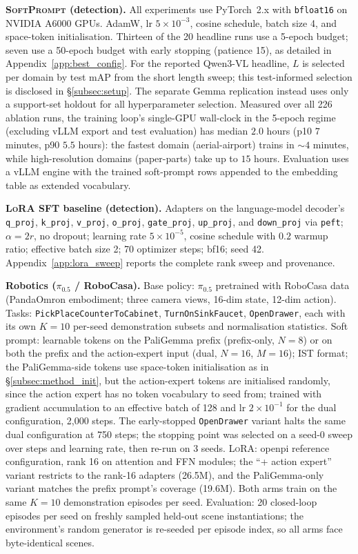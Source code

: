 \documentclass{article}
\newcommand{\ours}{\textsc{SoftPrompt}}
\newcommand{\lora}{\textsc{LoRA}}
\newcommand{\qwen}{Qwen3-VL}
\begin{document}
\textbf{\ours{} (detection).}
All experiments use PyTorch~2.x with \texttt{bfloat16} on NVIDIA A6000 GPUs.
AdamW, lr $5{\times}10^{-3}$, cosine schedule, batch size 4, and space-token
initialisation.
Thirteen of the 20 headline runs use a 5-epoch budget; seven use a 50-epoch
budget with early stopping (patience 15), as detailed in
Appendix~\ref{app:best_config}.
For the reported \qwen{} headline, $L$ is selected per domain by test mAP from
the short length sweep; this test-informed selection is disclosed in
\S\ref{subsec:setup}. The separate Gemma replication instead uses only a
support-set holdout for all hyperparameter selection.
Measured over all 226 ablation runs, the training loop's single-GPU wall-clock in the 5-epoch regime (excluding vLLM export and test evaluation) has median $2.0$ hours (p10 $7$ minutes, p90 $5.5$ hours): the fastest domain (aerial-airport) trains in ${\sim}4$ minutes, while high-resolution domains (paper-parts) take up to $15$ hours.
Evaluation uses a vLLM engine with the trained soft-prompt rows appended to the embedding table as extended vocabulary.

\textbf{\lora{} SFT baseline (detection).}
Adapters on the language-model decoder's \texttt{q\_proj},
\texttt{k\_proj}, \texttt{v\_proj}, \texttt{o\_proj},
\texttt{gate\_proj}, \texttt{up\_proj}, and \texttt{down\_proj} via
\texttt{peft}; $\alpha=2r$, no dropout; learning rate $5\times10^{-5}$,
cosine schedule with $0.2$ warmup ratio; effective batch size 2; 70 optimizer
steps; bf16; seed 42.
Appendix~\ref{app:lora_sweep} reports the complete rank sweep and provenance.

\textbf{Robotics ($\pi_{0.5}$ / RoboCasa).}
Base policy: $\pi_{0.5}$ pretrained with RoboCasa data (PandaOmron embodiment; three camera views, 16-dim state, 12-dim action).
Tasks: \texttt{PickPlaceCounterToCabinet}, \texttt{TurnOnSinkFaucet}, \texttt{OpenDrawer}, each with its own $K{=}10$ per-seed demonstration subsets and normalisation statistics.
Soft prompt: learnable tokens on the PaliGemma prefix (prefix-only, $N{=}8$) or on both the prefix and the action-expert input (dual, $N{=}16$, $M{=}16$); IST format; the PaliGemma-side tokens use space-token initialisation as in \S\ref{subsec:method_init}, but the action-expert tokens are initialised randomly, since the action expert has no token vocabulary to seed from; trained with gradient accumulation to an effective batch of 128 and lr $2{\times}10^{-1}$ for the dual configuration, 2{,}000 steps.
The early-stopped \texttt{OpenDrawer} variant halts the same dual configuration at 750 steps; the stopping point was selected on a seed-0 sweep over steps and learning rate, then re-run on 3 seeds.
\lora{}: openpi reference configuration, rank 16 on attention and FFN modules; the ``+ action expert'' variant restricts to the rank-16 adapters (26.5M), and the PaliGemma-only variant matches the prefix prompt's coverage (19.6M).
Both arms train on the same $K{=}10$ demonstration episodes per seed.
Evaluation: 20 closed-loop episodes per seed on freshly sampled held-out scene instantiations; the environment's random generator is re-seeded per episode index, so all arms face byte-identical scenes.
\end{document}
